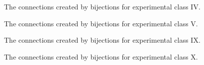 \begin{figure}[ht!]
    \centering
    
    \caption{The connections created by bijections for experimental class IV.}
    \label{fig:expgrp_IV}
\end{figure}


\begin{figure}[ht!]
    \centering
    
    \caption{The connections created by bijections for experimental class V.}
    \label{fig:expgrp_V}
\end{figure}


\begin{comment}
\begin{figure}[ht!]
    \centering
    
    \caption{The connections created by bijections for experimental class VI.}
    \label{fig:expgrp_VI}
\end{figure}
\end{comment}


\begin{comment}
\begin{figure}[ht!]
    \centering
    
    \caption{The connections created by bijections for experimental class VII.}
    \label{fig:expgrp_VII}
\end{figure}
\end{comment}


\begin{comment}
\begin{figure}[ht!]
    \centering
    
    \caption{The connections created by bijections for experimental class VIII.}
    \label{fig:expgrp_VIII}
\end{figure}
\end{comment}


\begin{figure}[ht!]
    \centering
    
    \caption{The connections created by bijections for experimental class IX.}
    \label{fig:expgrp_IX}
\end{figure}


\begin{figure}[ht!]
    \centering
    
    \caption{The connections created by bijections for experimental class X.}
    \label{fig:expgrp_X}
\end{figure}


